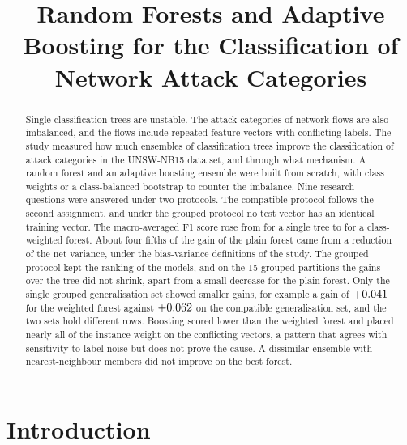 \documentclass[10pt,conference]{IEEEtran}
\begin{document}

\title{Random Forests and Adaptive Boosting for the Classification of Network Attack Categories}

\author{}

\maketitle

\begin{abstract}
Single classification trees are unstable. The attack categories of network flows are also imbalanced, and the flows include repeated feature vectors with conflicting labels. The study measured how much ensembles of classification trees improve the classification of attack categories in the UNSW-NB15 data set, and through what mechanism. A random forest and an adaptive boosting ensemble were built from scratch, with class weights or a class-balanced bootstrap to counter the imbalance. Nine research questions were answered under two protocols. The compatible protocol follows the second assignment, and under the grouped protocol no test vector has an identical training vector. The macro-averaged F1 score rose from \OPCompTreeMacroF{} for a single tree to \OPCompRfWMacroF{} for a class-weighted forest. About four fifths of the gain of the plain forest came from a reduction of the net variance, under the bias-variance definitions of the study. The grouped protocol kept the ranking of the models, and on the 15 grouped partitions the gains over the tree did not shrink, apart from a small decrease for the plain forest. Only the single grouped generalisation set showed smaller gains, for example a gain of $+0.041$ for the weighted forest against $+0.062$ on the compatible generalisation set, and the two sets hold different rows. Boosting scored lower than the weighted forest and placed nearly all of the instance weight on the conflicting vectors, a pattern that agrees with sensitivity to label noise but does not prove the cause. A dissimilar ensemble with nearest-neighbour members did not improve on the best forest.
\end{abstract}

\section{Introduction}
\label{sec:intro}
\end{document}
